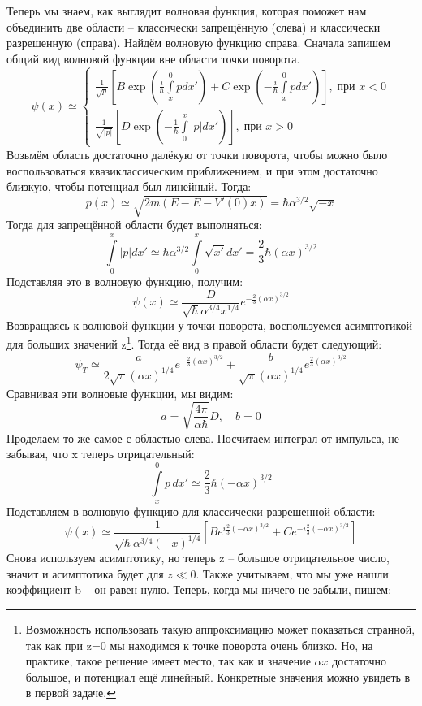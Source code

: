 Теперь мы знаем, как выглядит волновая функция, которая поможет нам объединить две области -- классически запрещённую (слева) и классически разрешенную (справа). Найдём волновую функцию справа. Сначала запишем общий вид волновой функции вне области точки поворота. 
\[
\psi(x) \simeq
\begin{cases}
    \frac{1}{\sqrt{p}}\left[B\exp\left(\frac{i}{\hbar}\int\limits_x^{0}p dx'\right) + C\exp\left(-\frac{i}{\hbar}\int\limits_x^{0}p dx'\right)\right],\; \text{при } x < 0\\
    \frac{1}{\sqrt{|p|}}\left[D\exp\left(-\frac{1}{\hbar}\int\limits_0^{x}|p| dx'\right)\right],\; \text{при } x > 0
\end{cases}
\]
Возьмём область достаточно далёкую от точки поворота, чтобы можно было воспользоваться квазиклассическим приближением, и при этом достаточно близкую, чтобы потенциал был линейный. Тогда:
\[
p(x) \simeq \sqrt{2m (E - E - V'(0)x)} = \hbar\alpha^{3/2}\sqrt{-x}
\]
Тогда для запрещённой области будет выполняться:
\[
\int\limits_{0}^{x}|p|dx' \simeq \hbar\alpha^{3/2}\int\limits_{0}^{x} \sqrt{x'}dx' = \frac{2}{3}\hbar(\alpha x)^{3/2}
\]
Подставляя это в волновую функцию, получим:
\[
\psi(x) \simeq \frac{D}{\sqrt{\hbar}\alpha^{3/4}x^{1/4}}e^{-\frac{2}{3}(\alpha x)^{3/2}}
\]
Возвращаясь к волновой функции у точки поворота, воспользуемся асимптотикой для больших значений z\footnote{Возможность использовать такую аппроксимацию может показаться странной, так как при z=0 мы находимся к точке поворота очень близко. Но, на практике, такое решение имеет место, так как и значение $\alpha x$ достаточно большое, и потенциал ещё линейный. Конкретные значения можно увидеть в  в первой задаче.}. Тогда её вид в правой области будет следующий:
\[
\psi_T \simeq \frac{a}{2\sqrt{\pi} (\alpha x)^{1/4}}e^{-\frac{2}{3}(\alpha x)^{3/2}} +  \frac{b}{\sqrt{\pi} (\alpha x)^{1/4}}e^{\frac{2}{3}(\alpha x)^{3/2}}
\]
Сравнивая эти волновые функции, мы видим:
\[
a = \sqrt{\frac{4\pi}{\alpha \hbar}}D, \quad b = 0
\]
Проделаем то же самое с областью слева. Посчитаем интеграл от импульса, не забывая, что x теперь отрицательный:
\[
\int\limits_{x}^{0}p\, dx' \simeq \frac{2}{3}\hbar(-\alpha x)^{3/2}
\]
Подставляем в волновую функцию для классически разрешенной области:
\[
\psi(x) \simeq \frac{1}{\sqrt{\hbar}\alpha^{3/4}(-x)^{1/4}}\left[Be^{i\frac{2}{3}(-\alpha x)^{3/2}}+ Ce^{-i\frac{2}{3}(-\alpha x)^{3/2}}\right]
\]
Снова используем асимптотику, но теперь z -- большое отрицательное число, значит и асимптотика будет для $z\ll 0$. Также учитываем, что мы уже нашли коэффициент b -- он равен нулю. Теперь, когда мы ничего не забыли, пишем:
